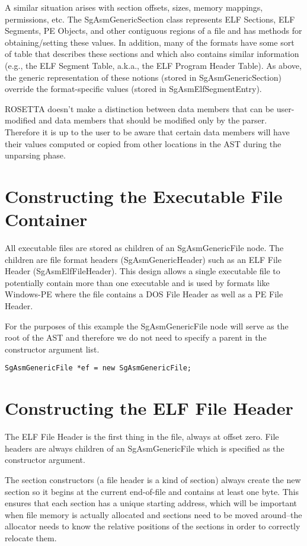 A similar situation arises with section offsets, sizes, memory
mappings, permissions, etc. The SgAsmGenericSection class represents
ELF Sections, ELF Segments, PE Objects, and other contiguous regions
of a file and has methods for obtaining/setting these values. In
addition, many of the formats have some sort of table that describes
these sections and which also contains similar information (e.g., the
ELF Segment Table, a.k.a., the ELF Program Header Table). As above,
the generic representation of these notions (stored in
SgAsmGenericSection) override the format-specific values (stored in
SgAsmElfSegmentEntry).

ROSETTA doesn't make a distinction between data members that can be
user-modified and data members that should be modified only by the
parser. Therefore it is up to the user to be aware that certain data
members will have their values computed or copied from other locations
in the AST during the unparsing phase.

\section{Constructing the Executable File Container}

All executable files are stored as children of an SgAsmGenericFile
node. The children are file format headers (SgAsmGenericHeader) such
as an ELF File Header (SgAsmElfFileHeader). This design allows a
single executable file to potentially contain more than one executable
and is used by formats like Windows-PE where the file contains a DOS
File Header as well as a PE File Header.

For the purposes of this example the SgAsmGenericFile node will serve
as the root of the AST and therefore we do not need to specify a
parent in the constructor argument list.

\begin{verbatim}
SgAsmGenericFile *ef = new SgAsmGenericFile;
\end{verbatim}

\section{Constructing the ELF File Header}

The ELF File Header is the first thing in the file, always at offset
zero. File headers are always children of an SgAsmGenericFile which is
specified as the constructor argument.

The section constructors (a file header is a kind of section) always
create the new section so it begins at the current end-of-file and
contains at least one byte. This ensures that each section has a
unique starting address, which will be important when file memory is
actually allocated and sections need to be moved around--the allocator
needs to know the relative positions of the sections in order to
correctly relocate them.

